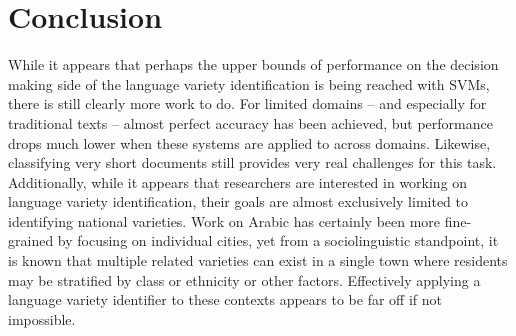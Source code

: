 \documentclass{article}
\begin{document}
  \section{Conclusion}
      While it appears that perhaps the upper bounds of performance on the decision making side of the language variety identification is being reached with SVMs, there is still clearly more work to do.
      For limited domains -- and especially for traditional texts -- almost perfect accuracy has been achieved, but performance drops much lower when these systems are applied to across domains.
      Likewise, classifying very short documents still provides very real challenges for this task.
      Additionally, while it appears that researchers are interested in working on language variety identification, their goals are almost exclusively limited to identifying national varieties.
      Work on Arabic has certainly been more fine-grained by focusing on individual cities, yet from a sociolinguistic standpoint, it is known that multiple related varieties can exist in a single town where residents may be stratified by class or ethnicity or other factors.
      Effectively applying a language variety identifier to these contexts appears to be far off if not impossible. 
  \printbibliography
\end{document}
